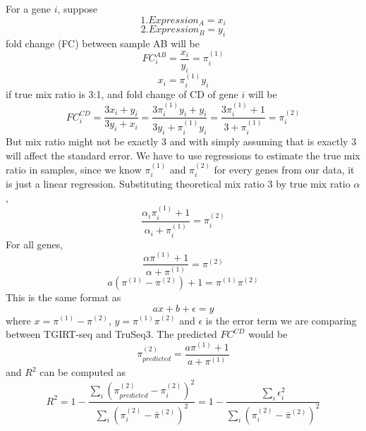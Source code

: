 \documentclass[12pt,a4paper]{article}
\begin{document}
\noindent For a gene $i$, suppose \newline
\[
1. Expression_{A} = x_i
\]
\[
2. Expression_{B} = y_i
\]
fold change (FC) between sample AB will be
\[
FC^{AB}_i = \frac{x_i}{y_i} = \pi^{(1)}_i
\]
\[
x_i = \pi^{(1)}_i y_i
\]
if true mix ratio is 3:1, and fold change of CD of gene $i$ will be
\[
FC^{CD}_{i} = \frac{3x_i + y_i}{3y_i+x_i} = \frac{3\pi^{(1)}_i y_i + y_i}{3y_i + \pi^{(1)}_i y_i}  = \frac{3\pi^{(1)}_i + 1}{3 + \pi^{(1)}_i } = \pi^{(2)}_i
\]
But mix ratio might not be exactly 3 and with simply assuming that is exactly 3 will affect the standard error. We have to use regressions to estimate the true mix ratio in samples, since we know $\pi^{(1)}_i$ and $\pi^{(2)}_i$ for every genes from our data, it is just a linear regression.
Substituting theoretical mix ratio 3 by true mix ratio $\alpha$,
\[
\frac{\alpha_i\pi^{(1)}_i + 1}{\alpha_i + \pi^{(1)}_i} = \pi^{(2)}_i
\]
For all genes,
\[
\frac{\alpha\pi^{(1)} + 1}{\alpha + \pi^{(1)}} = \pi^{(2)}
\]
\[
a(\pi^{(1)}-\pi^{(2)}) + 1 = \pi^{(1)}\pi^{(2)}
\]
This is the same format as
\[
ax + b + \epsilon= y
\]
where $x = \pi^{(1)} - \pi^{(2)}$, $y = \pi^{(1)}\pi^{(2)}$ and $\epsilon$ is the error term we are comparing between TGIRT-seq and TruSeq3. The predicted $FC^{CD}$ would be
\[
\pi^{(2)}_{predicted} = \frac{a\pi^{(1)} + 1}{a + \pi^{(1)}}
\]
and $R^2$ can be computed as
\[
R^2 = 1 - \frac{\sum_{i}(\pi^{(2)}_{predicted} - \pi^{(2)}_i)^2}{\sum_{i}(\pi_i^{(2)} - \bar{\pi}^{(2)})^2}= 1 - \frac{\sum_{i}\epsilon_i^2}{\sum_{i}(\pi_i^{(2)} - \bar{\pi}^{(2)})^2}
\]
\end{document}
